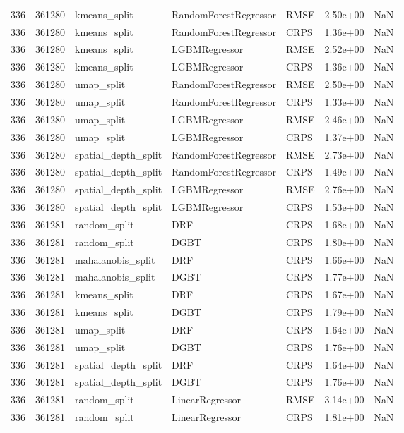 \begin{tabular}{rrlllrr}
336 & 361280 & kmeans\_split & RandomForestRegressor & RMSE & 2.50e+00 & NaN \\
336 & 361280 & kmeans\_split & RandomForestRegressor & CRPS & 1.36e+00 & NaN \\
336 & 361280 & kmeans\_split & LGBMRegressor & RMSE & 2.52e+00 & NaN \\
336 & 361280 & kmeans\_split & LGBMRegressor & CRPS & 1.36e+00 & NaN \\
336 & 361280 & umap\_split & RandomForestRegressor & RMSE & 2.50e+00 & NaN \\
336 & 361280 & umap\_split & RandomForestRegressor & CRPS & 1.33e+00 & NaN \\
336 & 361280 & umap\_split & LGBMRegressor & RMSE & 2.46e+00 & NaN \\
336 & 361280 & umap\_split & LGBMRegressor & CRPS & 1.37e+00 & NaN \\
336 & 361280 & spatial\_depth\_split & RandomForestRegressor & RMSE & 2.73e+00 & NaN \\
336 & 361280 & spatial\_depth\_split & RandomForestRegressor & CRPS & 1.49e+00 & NaN \\
336 & 361280 & spatial\_depth\_split & LGBMRegressor & RMSE & 2.76e+00 & NaN \\
336 & 361280 & spatial\_depth\_split & LGBMRegressor & CRPS & 1.53e+00 & NaN \\
336 & 361281 & random\_split & DRF & CRPS & 1.68e+00 & NaN \\
336 & 361281 & random\_split & DGBT & CRPS & 1.80e+00 & NaN \\
336 & 361281 & mahalanobis\_split & DRF & CRPS & 1.66e+00 & NaN \\
336 & 361281 & mahalanobis\_split & DGBT & CRPS & 1.77e+00 & NaN \\
336 & 361281 & kmeans\_split & DRF & CRPS & 1.67e+00 & NaN \\
336 & 361281 & kmeans\_split & DGBT & CRPS & 1.79e+00 & NaN \\
336 & 361281 & umap\_split & DRF & CRPS & 1.64e+00 & NaN \\
336 & 361281 & umap\_split & DGBT & CRPS & 1.76e+00 & NaN \\
336 & 361281 & spatial\_depth\_split & DRF & CRPS & 1.64e+00 & NaN \\
336 & 361281 & spatial\_depth\_split & DGBT & CRPS & 1.76e+00 & NaN \\
336 & 361281 & random\_split & LinearRegressor & RMSE & 3.14e+00 & NaN \\
336 & 361281 & random\_split & LinearRegressor & CRPS & 1.81e+00 & NaN \\

\end{tabular}
